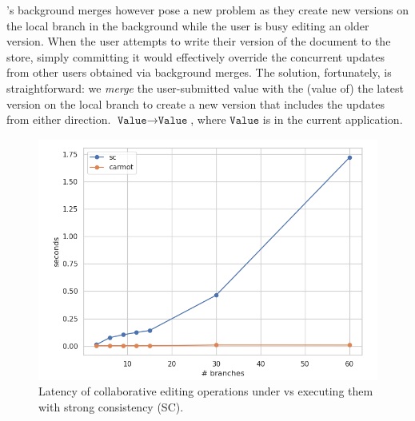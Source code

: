 \quark's background merges however pose a new problem as they create
new versions on the local branch in the background while the user is
busy editing an older version. When the user attempts to write their
version of the document to the store, simply committing it would
effectively override the concurrent updates from other users obtained
via background merges. The solution, fortunately, is straightforward:
we \emph{merge} the user-submitted value with the (value of) the
latest version on the local branch to create a new version that
includes the updates from either direction. 
$\texttt{Value} \rightarrow \texttt{Value}$, where $\texttt{Value}$ is
 in the current application.

\begin{figure}[ht]
  \centering
    \includegraphics[scale=0.3]{Figures/latency}
\caption{Latency of collaborative editing operations under \quark vs
  executing them with strong consistency (SC). }
\label{fig:latency}
\end{figure}

